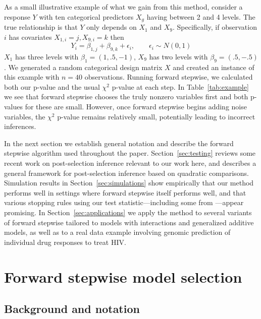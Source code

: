 \documentclass{imsart}
\begin{document}
As a small illustrative example of what we gain from this method,
consider a response $Y$ with ten
categorical predictors $X_g$ having between 2 and 4 levels. The true 
relationship is that $Y$ only depends on $X_1$ and $X_9$. Specifically,
if observation $i$ has covariates $X_{1,i} = j, X_{9,i} = k$ then
\[
    Y_i = \beta_{1,j} + \beta_{9,k} + \epsilon_i , \qquad
    \epsilon_i \sim N(0,1)
\]
$X_1$ has three levels with $\beta_1 = (1, .5, -1)$, $X_9$
has two levels with $\beta_9 = (.5, -.5)$. We generated a random
categorical design matrix $X$ and created an instance of this example
with $n = 40$ observations. Running forward stepwise, we calculated
both our p-value and the usual $\chi^2$ p-value at each step. In
Table~\ref{tab:example} we see that forward stepwise chooses the
truly nonzero variables first and both p-values for these are small.
However, once forward stepwise begins adding noise variables, the
$\chi^2$ p-value remains relatively small, potentially leading to 
incorrect inferences.




In the next section we establish general notation and describe the
forward stepwise algorithm used throughout the paper.
Section~\ref{sec:testing} reviews some recent work on
post-selection inference
\citep{significance:lasso,tests:adaptive,lasso:fixed}
relevant to our work here, and describes a general framework
for post-selection inference based on quadratic comparisons.
Simulation results in Section~\ref{sec:simulations} show
empirically that our method performs well in settings where forward
stepwise itself performs well, and that
various stopping rules using our test statistic---including
some from \cite{sequential:fdr}---appear promising. In
Section~\ref{sec:applications} we apply
the method to several variants of forward
stepwise tailored to models with interactions and generalized additive
models, as well as to a real data example involving genomic prediction
of individual drug responses to treat HIV.


\section{Forward stepwise model selection}
\label{sec:stepwise}

\subsection{Background and notation}
\end{document}
